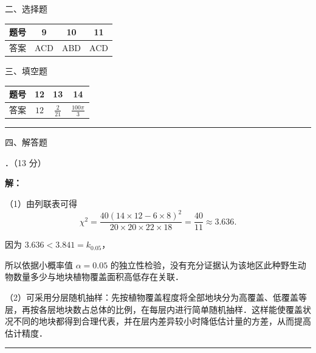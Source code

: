 \documentclass[a4paper,12pt]{ctexart}
\begin{document}
\vspace{0.5cm}

{\heiti 二、选择题}

\vspace{0.3cm}
\begin{center}
\begin{tabular}{c|ccc}
\toprule
题号 & 9 & 10 & 11 \\
\midrule
答案 & ACD & ABD & ACD \\
\bottomrule
\end{tabular}
\end{center}

\vspace{0.5cm}

{\heiti 三、填空题}

\vspace{0.3cm}
\begin{center}
\begin{tabular}{c|ccc}
\toprule
题号 & 12 & 13 & 14 \\
\midrule
答案 & $12$ & $\displaystyle\frac{2}{21}$ & $\displaystyle\frac{100\pi}{3}$ \\
\bottomrule
\end{tabular}
\end{center}

\vspace{0.5cm}
{\small\noindent\rule{\textwidth}{0.4pt}}
\vspace{0.3cm}

{\heiti 四、解答题}

\vspace{0.4cm}
{．（13 分）}

\textbf{解：}

（1）由列联表可得
\[
\chi^{2} = \frac{40(14 \times 12 - 6 \times 8)^{2}}{20 \times 20 \times 22 \times 18}
        = \frac{40}{11} \approx 3.636.
\]

因为 $3.636 < 3.841 = k_{0.05}$，

所以依据小概率值 $\alpha = 0.05$ 的独立性检验，没有充分证据认为该地区此种野生动物数量多少与地块植物覆盖面积高低存在关联．

（2）可采用分层随机抽样：先按植物覆盖程度将全部地块分为高覆盖、低覆盖等层，再按各层地块数占总体的比例，在每层内进行简单随机抽样．这样能使覆盖状况不同的地块都得到合理代表，并在层内差异较小时降低估计量的方差，从而提高估计精度．

\vspace{0.2cm}
{\small\noindent\rule{\textwidth}{0.2pt}}
\end{document}
